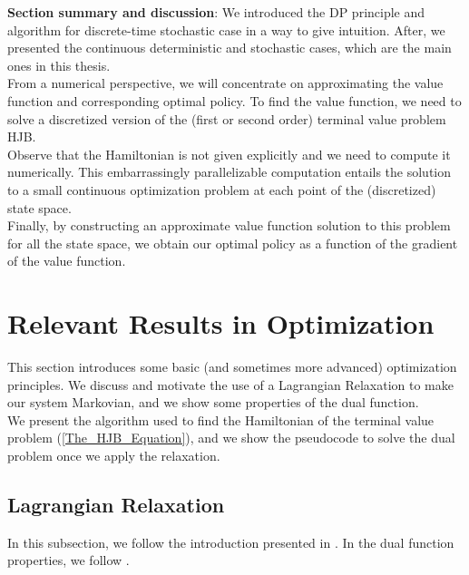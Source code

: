 \textbf{Section summary and discussion}: We introduced the DP principle and algorithm for discrete-time stochastic case in a way to give intuition. After, we presented the continuous deterministic and stochastic cases, which are the main ones in this thesis.\\
From a numerical perspective, we will concentrate on approximating the value function and corresponding optimal policy. To find the value function, we need to solve a discretized version of the (first or second order) terminal value problem HJB. \\
Observe that the Hamiltonian is not given explicitly and we need to compute it numerically.  This embarrassingly parallelizable computation entails the solution to a small continuous optimization problem at each point of the (discretized) state space.\\
Finally, by constructing an approximate value function solution to this problem for all the state space, we obtain our optimal policy as a function of the gradient of the value function.

\section{Relevant Results in Optimization}

This section introduces some basic (and sometimes more advanced) optimization principles. We discuss and motivate the use of a Lagrangian Relaxation to make our system Markovian, and we show some properties of the dual function.\\
We present the algorithm used to find the Hamiltonian of the terminal value problem (\ref{The_HJB_Equation}), and we show the pseudocode to solve the dual problem once we apply the relaxation.

\subsection{Lagrangian Relaxation}

In this subsection, we follow the introduction presented in \cite{berkovitz2013optimal}. 
In the dual function properties, we follow \cite{bazaraa2013nonlinear}.\\

